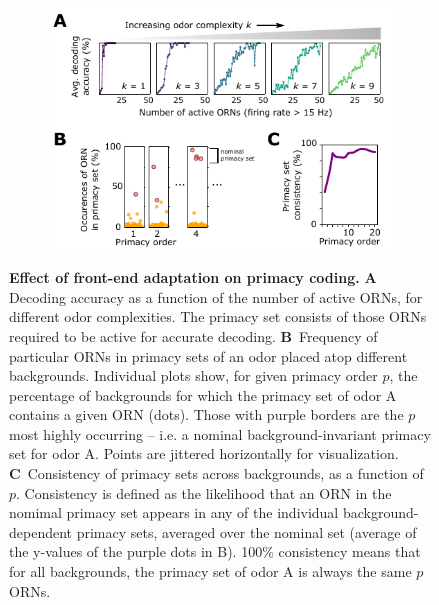 \documentclass[10pt,prl,aps,showpacs,twocolumn,unsortedaddress,showkeys,linenumbers]{revtex4-1}
\begin{document}
\begin{figure}[tb]
	\begin{subfigure}[t]{\linewidth}
		\includegraphics[width=\textwidth]{figures/4_primacy_coding}
		\label{fig:primacy_coding_a}	
	\end{subfigure}
	\begin{subfigure}[t]{0\linewidth}
		\label{fig:primacy_coding_b}
	\end{subfigure}
	\begin{subfigure}[t]{0\linewidth}
		\label{fig:primacy_coding_c}
	\end{subfigure}
	\caption{\footnotesize{\textbf{Effect of front-end adaptation on primacy coding.}
	\textbf{A} Decoding accuracy as a function of the number of active ORNs, for different odor complexities. The primacy set consists of those ORNs required to be active for accurate decoding. %
	\textbf{B}~Frequency of particular ORNs in primacy sets of an odor placed atop different backgrounds. Individual plots show, for given primacy order $p$, the percentage of backgrounds for which the primacy set of odor A contains a given ORN (dots). Those with purple borders are the $p$ most highly occurring -- i.e. a nominal background-invariant primacy set for odor A. Points are jittered horizontally for visualization.
	\textbf{C}~Consistency of primacy sets across backgrounds, as a function of $p$. Consistency is defined as the likelihood that an ORN in the nomimal primacy set appears in any of the individual background-dependent primacy sets, averaged over the nominal set (average of the y-values of the purple dots in B). 100\% consistency means that for all backgrounds, the primacy set of odor A is always the same $p$ ORNs.
	}}
	\label{fig:primacy_coding}
\end{figure}
\end{document}
